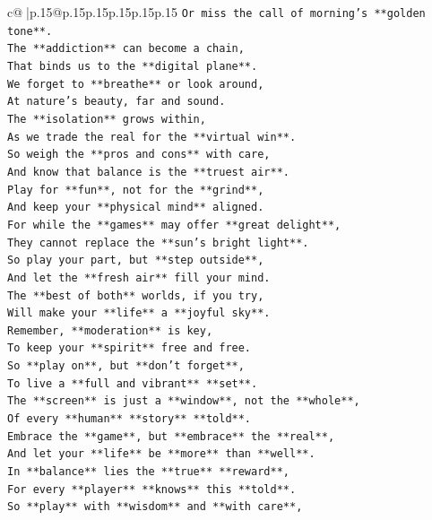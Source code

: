 \documentclass{article}
\begin{document}
{\begin{supertabular}{c@{$\;$}|p{.15\linewidth}@{}p{.15\linewidth}p{.15\linewidth}p{.15\linewidth}p{.15\linewidth}p{.15\linewidth}}
{{{\texttt{Or miss the call of morning's **golden tone**.} \\
\texttt{The **addiction** can become a chain,} \\
\texttt{That binds us to the **digital plane**.} \\
\texttt{We forget to **breathe** or look around,} \\
\texttt{At nature's beauty, far and sound.} \\
\texttt{The **isolation** grows within,} \\
\texttt{As we trade the real for the **virtual win**.} \\
\texttt{So weigh the **pros and cons** with care,} \\
\texttt{And know that balance is the **truest air**.} \\
\texttt{Play for **fun**, not for the **grind**,} \\
\texttt{And keep your **physical mind** aligned.} \\
\texttt{For while the **games** may offer **great delight**,} \\
\texttt{They cannot replace the **sun's bright light**.} \\
\texttt{So play your part, but **step outside**,} \\
\texttt{And let the **fresh air** fill your mind.} \\
\texttt{The **best of both** worlds, if you try,} \\
\texttt{Will make your **life** a **joyful sky**.} \\
\texttt{Remember, **moderation** is key,} \\
\texttt{To keep your **spirit** free and free.} \\
\texttt{So **play on**, but **don't forget**,} \\
\texttt{To live a **full and vibrant** **set**.} \\
\texttt{The **screen** is just a **window**, not the **whole**,} \\
\texttt{Of every **human** **story** **told**.} \\
\texttt{Embrace the **game**, but **embrace** the **real**,} \\
\texttt{And let your **life** be **more** than **well**.} \\
\texttt{In **balance** lies the **true** **reward**,} \\
\texttt{For every **player** **knows** this **told**.} \\
\texttt{So **play** with **wisdom** and **with care**,} \\
}}}
\end{supertabular}}
\end{document}
